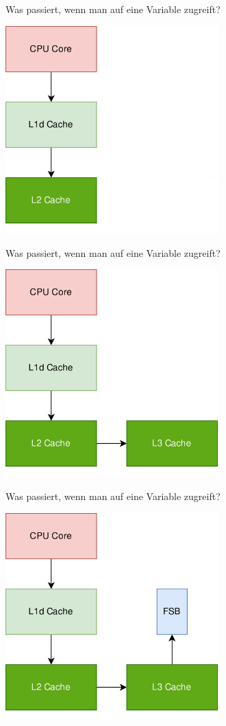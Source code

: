\documentclass{beamer}
\begin{document}
\begin{frame}{Was passiert, wenn man auf eine Variable zugreift?}
\vspace*{0.5cm}
\centerline{\includegraphics[height=8cm]{trace3.png}}
\end{frame}

\begin{frame}{Was passiert, wenn man auf eine Variable zugreift?}
\vspace*{0.5cm}
\centerline{\includegraphics[height=8cm]{trace4.png}}
\end{frame}

\begin{frame}{Was passiert, wenn man auf eine Variable zugreift?}
\vspace*{0.5cm}
\centerline{\includegraphics[height=8cm]{trace5.png}}
\end{frame}
\end{document}

